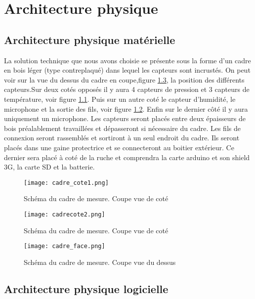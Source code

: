 \chapter{Architecture physique}

\section{Architecture physique matérielle}
\vspace{1.5cm}
La solution technique que nous avons choisie se présente sous la forme d'un cadre en bois léger (type contreplaqué) dans lequel les capteurs sont incrustés. On peut voir sur la vue du dessus du cadre en coupe,figure \ref{fig:face}, la position des différents capteurs.Sur deux cotés opposés il y aura 4 capteurs de pression et 3 capteurs de température, voir figure \ref{fig:cote1}. Puis sur un autre coté le capteur d'humidité, le microphone et la sortie des fils, voir figure \ref{fig:cote2}. Enfin sur le dernier côté il y aura uniquement un microphone. Les capteurs seront placés entre deux épaisseurs de bois préalablement travaillées et dépasseront si nécessaire du cadre. Les fils de connexion seront rassemblés et sortiront à un seul endroit du cadre. Ils seront placés dans une gaine protectrice et se connecteront au boitier extérieur. Ce dernier sera placé à coté de la ruche et comprendra la carte arduino et son shield 3G, la carte SD et la batterie. 

\begin{figure}[h!]
\centering\texttt{[image: cadre\_cote1.png]}
\caption{\label{fig:cote1} Schéma du cadre de mesure. Coupe vue de coté}
\end{figure}

\begin{figure}[h!]
\centering\texttt{[image: cadrecote2.png]}
\caption{\label{fig:cote2} Schéma du cadre de mesure. Coupe vue de coté}
\end{figure}

\begin{figure}[h!]
\centering\texttt{[image: cadre\_face.png]}
\caption{\label{fig:face} Schéma du cadre de mesure. Coupe vue du dessus}
\end{figure}


\clearpage

\section{Architecture physique logicielle}

